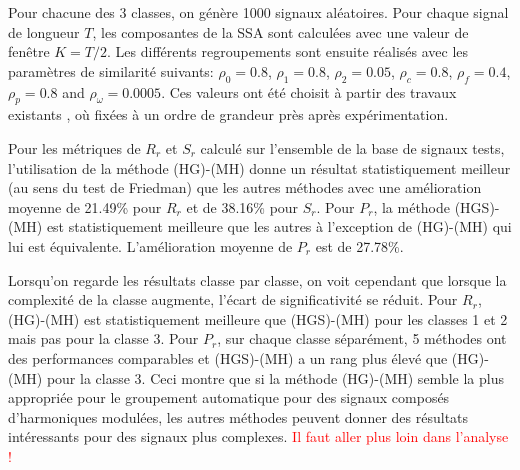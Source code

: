 \documentclass{gretsi}
\begin{document}
Pour chacune des 3 classes, on génère 1000 signaux aléatoires.
Pour chaque signal de longueur $T$, les composantes de la SSA sont calculées avec une valeur de fenêtre $K=T/2$.
Les différents regroupements sont ensuite réalisés avec les paramètres de similarité suivants: $\rho_0=0.8$, $\rho_1=0.8$, $\rho_2=0.05$, $\rho_c=0.8$, $\rho_f=0.4$, $\rho_p=0.8$ and $\rho_\omega=0.0005$.
Ces valeurs ont été choisit à partir des travaux existants \cite{abalov_14_auto,alvarez_13_auto}, où fixées à un ordre de grandeur près après expérimentation.

Pour les métriques de $R_r$ et $S_r$ calculé sur l'ensemble de la base de signaux tests, l'utilisation de la méthode (HG)-(MH) donne un résultat statistiquement meilleur (au sens du test de Friedman) que les autres méthodes avec une amélioration moyenne de 21.49\% pour $R_r$ et de 38.16\% pour $S_r$.
Pour $P_r$, la méthode (HGS)-(MH) est statistiquement meilleure que les autres à l'exception de (HG)-(MH) qui lui est équivalente.
L'amélioration moyenne de $P_r$ est de 27.78\%.

Lorsqu'on regarde les résultats classe par classe, on voit cependant que lorsque la complexité de la classe augmente, l'écart de significativité se réduit.
Pour $R_r$, (HG)-(MH) est statistiquement meilleure que (HGS)-(MH) pour les classes 1 et 2 mais pas pour la classe 3. 
Pour $P_r$, sur chaque classe séparément, 5 méthodes ont des performances comparables et (HGS)-(MH) a un rang plus élevé que (HG)-(MH) pour la classe 3.
Ceci montre que si la méthode (HG)-(MH) semble la plus appropriée pour le groupement automatique pour des signaux composés d'harmoniques modulées, les autres méthodes peuvent donner des résultats intéressants pour des signaux plus complexes.
\textcolor{red}{Il faut aller plus loin dans l'analyse !}

 
\scriptsize
{}
\end{document}
